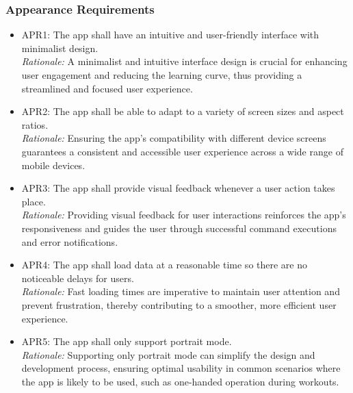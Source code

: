 \documentclass[12pt]{article}
\begin{document}
\subsubsection{Appearance Requirements}
\begin{itemize}
\item APR1: The app shall have an intuitive and user-friendly interface with minimalist design.\\
\textit{Rationale:} A minimalist and intuitive interface design is crucial for enhancing user engagement and reducing the learning curve, thus providing a streamlined and focused user experience.
\item APR2: The app shall be able to adapt to a variety of screen sizes and aspect ratios.\\
\textit{Rationale:} Ensuring the app’s compatibility with different device screens guarantees a consistent and accessible user experience across a wide range of mobile devices.
\item APR3: The app shall provide visual feedback whenever a user action takes place.\\
\textit{Rationale:} Providing visual feedback for user interactions reinforces the app's responsiveness and guides the user through successful command executions and error notifications.
\item APR4: The app shall load data at a reasonable time so there are no noticeable delays for users.\\
\textit{Rationale:} Fast loading times are imperative to maintain user attention and prevent frustration, thereby contributing to a smoother, more efficient user experience.
\item APR5: The app shall only support portrait mode.\\
\textit{Rationale:} Supporting only portrait mode can simplify the design and development process, ensuring optimal usability in common scenarios where the app is likely to be used, such as one-handed operation during workouts.
\end{itemize}
\end{document}
